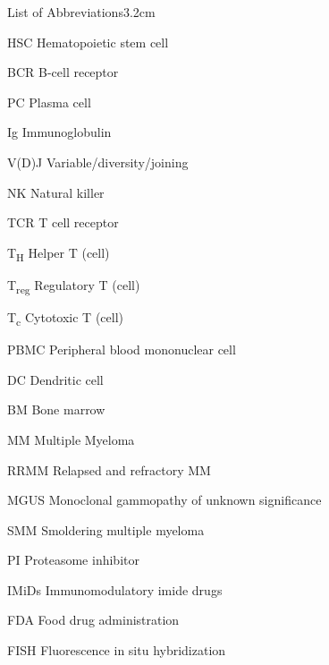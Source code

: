\begin{mclistof}{List of Abbreviations}{3.2cm}

\item[HSC] Hematopoietic stem cell

\item[BCR] B-cell receptor

\item[PC] Plasma cell

\item[Ig] Immunoglobulin

\item[V(D)J] Variable/diversity/joining

\item[NK] Natural killer

\item[TCR] T cell receptor

\item[T\textsubscript{H}] Helper T (cell)

\item[T\textsubscript{reg}] Regulatory T (cell)

\item[T\textsubscript{c}] Cytotoxic T (cell)

\item[PBMC] Peripheral blood mononuclear cell

\item[DC] Dendritic cell

\item[BM] Bone marrow

\item[MM] Multiple Myeloma

\item[RRMM] Relapsed and refractory MM

\item[MGUS] Monoclonal gammopathy of unknown significance

\item[SMM] Smoldering multiple myeloma

\item[PI] Proteasome inhibitor

\item[IMiDs] Immunomodulatory imide drugs

\item[FDA] Food drug administration

\item[FISH] Fluorescence in situ hybridization


\end{mclistof}
